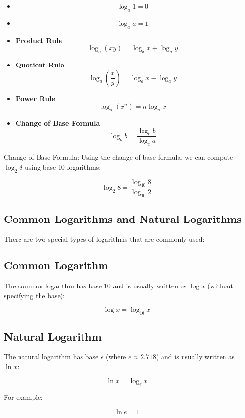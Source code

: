 \begin{itemize}
 \item
\[
 \log_{a}1 = 0
\]

 \item
\[
 \log_{a}a = 1
\]
\item \textbf{Product Rule}
\[
\log_a (xy) = \log_a x + \log_a y
\]
\item \textbf{Quotient Rule}
\[
\log_a \left( \frac{x}{y} \right) = \log_a x - \log_a y
\]
\item \textbf{Power Rule}
\[
\log_a (x^n) = n \log_a x
\]
\item \textbf{Change of Base Formula}
\[
\log_a b = \frac{\log_c b}{\log_c a}
\]
\end{itemize}

\begin{example}
Change of Base Formula:
Using the change of base formula, we can compute \( \log_2 8 \) using base 10 logarithms:

\[
\log_2 8 = \frac{\log_{10} 8}{\log_{10} 2}
\]

\end{example}

\subsection{Common Logarithms and Natural Logarithms}

There are two special types of logarithms that are commonly used:

\subsection*{Common Logarithm}

The common logarithm has base 10 and is usually written as \( \log x \) (without specifying the base):

\[
\log x = \log_{10} x
\]

\subsection*{Natural Logarithm}

The natural logarithm has base \( e \) (where \( e \approx 2.718 \)) and is usually written as \( \ln x \):

\[
\ln x = \log_e x
\]

For example:

\[
\ln e = 1
\]



